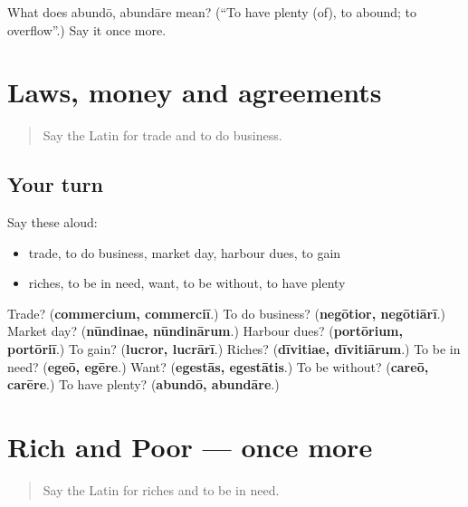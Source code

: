 \begin{tcolorbox}[breakable,colback=teal!4,colframe=teal!35!black,title={Before you move on}]
What does abundō, abundāre mean? (\textquotedblleft{}To have plenty (of), to abound; to overflow\textquotedblright{}.) Say it once more.
\end{tcolorbox}
\section[(dialogue)]{Laws, money and agreements}

\label{lesson:LA-R422-review-421-422}



\begin{quote}
Say the Latin for trade and to do business.
\end{quote}

\subsection*{Your turn}
Say these aloud:

\begin{itemize}
\raggedright
  \item trade, to do business, market day, harbour dues, to gain
  \item riches, to be in need, want, to be without, to have plenty
\end{itemize}

\begin{tcolorbox}[breakable,colback=teal!4,colframe=teal!35!black,title={Before you move on}]
Trade? (\textbf{commercium, commerciī}.) To do business? (\textbf{negōtior, negōtiārī}.) Market day? (\textbf{nūndinae, nūndinārum}.) Harbour dues? (\textbf{portōrium, portōriī}.) To gain? (\textbf{lucror, lucrārī}.) Riches? (\textbf{dīvitiae, dīvitiārum}.) To be in need? (\textbf{egeō, egēre}.) Want? (\textbf{egestās, egestātis}.) To be without? (\textbf{careō, carēre}.) To have plenty? (\textbf{abundō, abundāre}.)
\end{tcolorbox}
\section[(dialogue)]{Rich and Poor — once more}

\label{lesson:LA-R422-review-final-422}



\begin{quote}
Say the Latin for riches and to be in need.
\end{quote}

